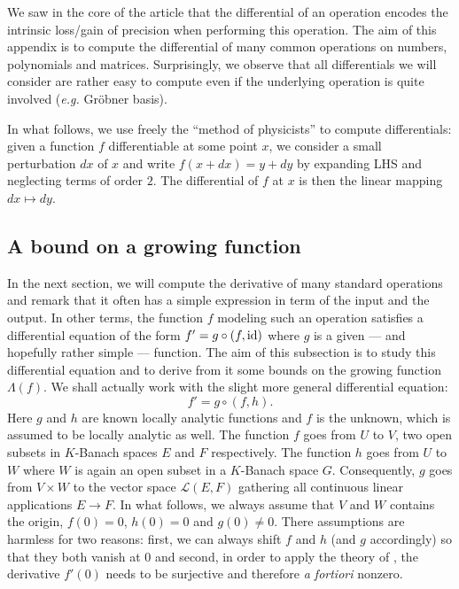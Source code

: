 \documentclass{sig-alternate}
\begin{document}
{\color{Bittersweet}

We saw in the core of the article that the differential of an operation
encodes the intrinsic loss/gain of precision when performing this
operation. The aim of this appendix is to compute the differential of
many common operations on numbers, polynomials and matrices. Surprisingly,
we observe that all differentials we will consider are rather easy to
compute even if the underlying operation is quite involved (\emph{e.g.}
Gr\"obner basis).

In what follows, we use freely the ``method of physicists'' to compute
differentials: given a function $f$ differentiable at some point $x$, we
consider a small perturbation $dx$ of $x$ and write $f(x+dx) = y + dy$
by expanding LHS and neglecting terms of order $2$. The differential of
$f$ at $x$ is then the linear mapping $dx \mapsto dy$.

}


\subsection{A bound on a growing function}
\label{ssec:boundLambdaf}

In the next section, we will compute the derivative of many standard 
operations and remark that it often has a simple expression in term of 
the input and the output. In other terms, the function $f$ modeling
such an operation satisfies a differential equation of the form
$f' = g \circ (f, \textrm{id})$
where $g$ is a given --- and hopefully rather simple --- function. The 
aim of this subsection is to study this differential equation and to 
derive from it some bounds on the growing function $\Lambda(f)$.
We shall actually work with the slight more general differential 
equation:
\begin{equation}
\label{eq:diffequah}
f' = g \circ (f, h).
\end{equation}
Here $g$ and $h$ are known locally analytic functions and $f$ is the 
unknown, which is assumed to be locally analytic as well. The function
$f$ goes from $U$ to $V$, two open subsets in $K$-Banach spaces $E$ 
and $F$ respectively. The function $h$ goes from $U$ to $W$ where $W$
is again an open subset in a $K$-Banach space $G$. Consequently, $g$
goes from $V \times W$ to the vector space $\mathcal L(E,F)$ gathering
all continuous linear applications $E \to F$.
In what follows, we always assume that $V$ and $W$ contains the origin, 
$f(0) = 0$, $h(0) = 0$ and $g(0) \neq 0$. There assumptions are harmless 
for two reasons: first, we can always shift $f$ and $h$ (and $g$ 
accordingly) so that they both vanish at $0$ and second, in order to 
apply the theory of \cite{caruso-roe-vaccon:14a}, the derivative $f'(0)$ needs to be 
surjective and therefore \emph{a fortiori} nonzero.
\end{document}
